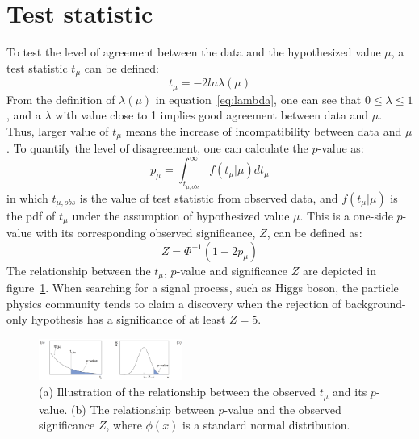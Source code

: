 \section{Test statistic}

To test the level of agreement between the data and the hypothesized value $\mu$, a test statistic $t_{\mu}$ can be defined:
\begin{equation}
    t_{\mu} = -2 ln \lambda (\mu)
\end{equation}
From the definition of $\lambda(\mu)$ in equation~\ref{eq:lambda}, one can see that $0 \le \lambda \le 1$,
and a $\lambda$ with value close to 1 implies good agreement between data and $\mu$.
Thus, larger value of $t_{\mu}$ means the increase of incompatibility between data and $\mu$.
To quantify the level of disagreement, one can calculate the $p$-value as:
\begin{equation}
    p_{\mu} = \int_{t_{\mu, obs}}^{\infty} f(t_{\mu}|\mu) d t_{\mu}
\end{equation}
in which $t_{\mu, obs}$ is the value of test statistic from observed data, 
and $f(t_{\mu}|\mu)$ is the pdf of $t_{\mu}$ under the assumption of hypothesized value $\mu$.
This is a one-side $p$-value with its corresponding observed significance, $Z$, can be defined as:
\begin{equation}
    Z = \Phi^{-1}(1-2p_{\mu})
\end{equation}
The relationship between the $t_{\mu}$, $p$-value and significance $Z$ are depicted in figure~\ref{fig:pvalue_Z}.
When searching for a signal process, such as Higgs boson, the particle physics community tends to claim a discovery
when the rejection of background-only hypothesis has a significance of at least $Z = 5$.

\begin{figure}[!htbp]
\begin{center}
\includegraphics[width=0.42\textwidth]{figures/Statistic/test_statistic_pvalue_Z.png}
\end{center}
\caption{(a) Illustration of the relationship between the observed $t_{\mu}$ and its $p$-value. 
         (b) The relationship between $p$-value and the observed significance $Z$, where $\phi(x)$ is a standard normal distribution.
        }
\label{fig:pvalue_Z}
\end{figure}


